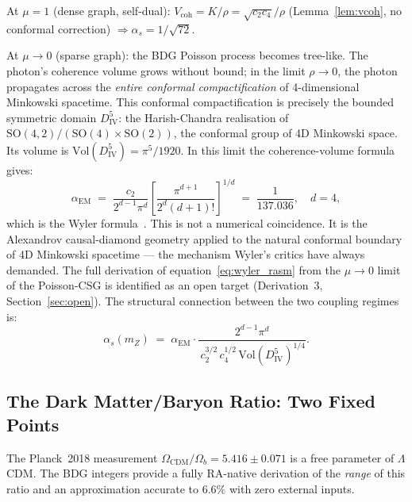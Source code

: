 \documentclass[11pt,a4paper]{article}
\begin{document}
At $\mu=1$ (dense graph, self-dual): $V_{\mathrm{coh}} = K/\rho = \sqrt{c_2 c_4}/\rho$
(Lemma~\ref{lem:vcoh}, no conformal correction) $\Rightarrow \alpha_s = 1/\sqrt{72}$.

At $\mu\to 0$ (sparse graph): the BDG Poisson process becomes tree-like.
The photon's coherence volume grows without bound; in the limit $\rho\to 0$,
the photon propagates across the \emph{entire conformal compactification}
of 4-dimensional Minkowski spacetime.  This conformal compactification is
precisely the bounded symmetric domain $D_{\mathrm{IV}}^5$: the
Harish-Chandra realisation of $\mathrm{SO}(4,2)/(\mathrm{SO}(4)\times\mathrm{SO}(2))$,
the conformal group of 4D Minkowski space.  Its volume is
$\mathrm{Vol}(D_{\mathrm{IV}}^5) = \pi^5/1920$.
In this limit the coherence-volume formula gives:
\begin{equation}
  \alpha_{\mathrm{EM}} \;=\; \frac{c_2}{2^{d-1}\pi^d}
  \left[\frac{\pi^{d+1}}{2^d(d+1)!}\right]^{1/d}
  \;=\; \frac{1}{137.036},
  \quad d=4,
  \label{eq:wyler_rasm}
\end{equation}
which is the Wyler formula~\citep{Wyler1969,Sandeman2026BDG}.  This
is not a numerical coincidence.  It is the Alexandrov causal-diamond
geometry applied to the natural conformal boundary of 4D Minkowski
spacetime --- the mechanism Wyler's critics have always demanded.
The full derivation of equation~\eqref{eq:wyler_rasm} from the
$\mu\to 0$ limit of the Poisson-CSG is identified as an open target
(Derivation~3, Section~\ref{sec:open}).  The structural connection
between the two coupling regimes is:
\begin{equation}
  \alpha_s(m_Z) \;=\; \alpha_{\mathrm{EM}}
  \cdot \frac{2^{d-1}\pi^d}{\,c_2^{3/2}\,c_4^{1/2}\,
  \mathrm{Vol}(D_{\mathrm{IV}}^5)^{1/4}}.
  \label{eq:coupling_connection}
\end{equation}

\subsection{The Dark Matter/Baryon Ratio: Two Fixed Points}
\label{sec:f0}

The Planck~2018 measurement $\Omega_{\mathrm{CDM}}/\Omega_b = 5.416 \pm 0.071$
is a free parameter of $\Lambda$CDM.  The BDG integers provide a fully
RA-native derivation of the \emph{range} of this ratio and an approximation
accurate to $6.6\%$ with zero external inputs.
\end{document}
